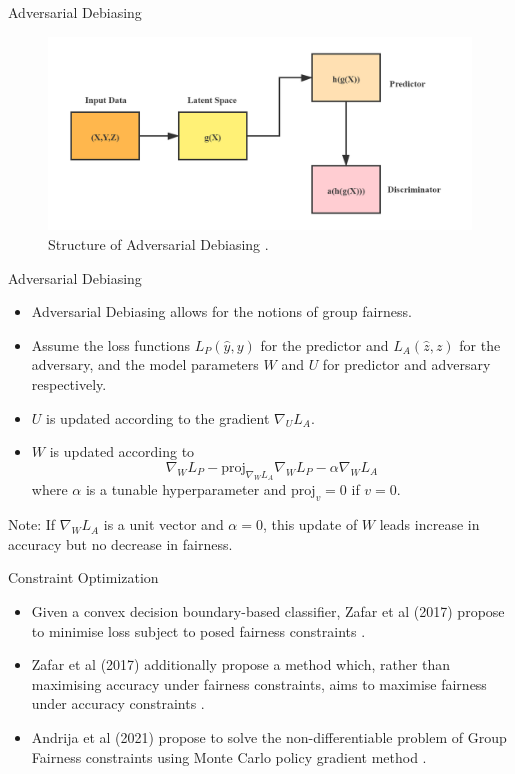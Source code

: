 \documentclass[10pt, xcolor=table,aspectratio=169]{beamer}
\begin{document}
\begin{frame}{Adversarial Debiasing}
	\begin{figure}[t]
		\begin{center}
			\includegraphics[width=0.8\columnwidth]{./figs/ADB.png}
		\end{center}
		\caption{Structure of Adversarial  Debiasing \cite{zhang2018mitigating}.}
	\end{figure}
\end{frame}

\begin{frame}{Adversarial Debiasing}
	\begin{itemize}
		\item Adversarial Debiasing allows for the notions of group fairness.
		\item Assume the loss functions $L_P(\hat{y},y)$ for the predictor and $L_A(\hat{z},z)$ for the adversary, and the model parameters $W$ and $U$ for predictor and adversary respectively.
		\item $U$ is updated according to the gradient $\nabla_UL_A$.
		\item $W$ is updated according to
		      \[\nabla_WL_P-\text{proj}_{\nabla_W L_A}\nabla_WL_P -\alpha \nabla_WL_A\]
		      where $\alpha $ is a tunable hyperparameter and $\text{proj}_v=0$ if $v=0$.
	\end{itemize}
	Note: If $\nabla_W L_A$ is a unit vector and $\alpha=0$, this update of $W$ leads increase in accuracy but no decrease in fairness.
\end{frame}

\begin{frame}{Constraint Optimization}
	\begin{itemize}
		\item Given a convex decision boundary-based classifier, Zafar et al (2017) propose to minimise loss subject to posed fairness constraints  \cite{zafar2017fairness}.
		\item Zafar et al (2017)  additionally propose a method which, rather than maximising accuracy under fairness constraints, aims to maximise fairness under accuracy constraints \cite{zafar2017fairness2}.
		\item Andrija et al (2021) propose to solve the non-differentiable problem of Group Fairness constraints using Monte Carlo policy gradient method \cite{petrovic2021fair}.

	\end{itemize}
\end{frame}
\end{document}
